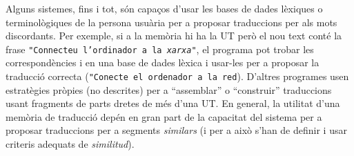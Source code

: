 Alguns sistemes, fins i tot, són
capaços d'usar les bases de dades lèxiques o terminològiques de la
persona usuària per a proposar traduccions per als mots discordants.
Per exemple, si a la memòria hi ha la UT  però el nou text conté la frase \texttt{"{}Connecteu
  l'ordinador a la \emph{xarxa}"}, el programa pot trobar les
correspondències 
 i   en una base de dades lèxica i usar-les per a
proposar la traducció correcta (\texttt{"{}Conecte el ordenador a la
  red}).  D'altres programes usen estratègies pròpies (no descrites)
per a ``assemblar'' o ``construir'' traduccions usant fragments de
parts dretes de més d'una UT.  En general, la utilitat d'una memòria
de traducció depén en gran part de la capacitat del sistema per a
proposar traduccions per a segments {\em similars} (i per a això s'han
de definir i usar criteris adequats de \emph{similitud}).

